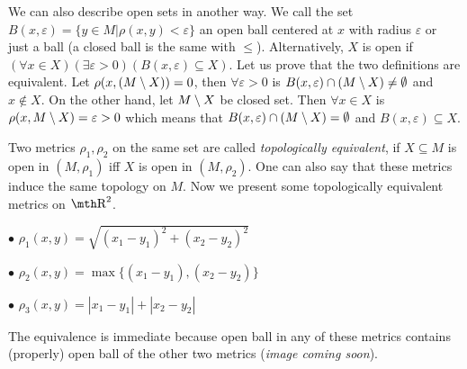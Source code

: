 \medskip

We can also describe open sets in another way. We call the set $B(x,
\varepsilon) = \{y\in M|\rho(x,y)<\varepsilon\}$ an open ball centered at $x$ 
with radius $\varepsilon$ or just a ball (a closed ball is the same with 
$\leq$). Alternatively, $X$ is open if $(\forall x\in X)(\exists \varepsilon 
> 0)(B(x,\varepsilon)\subseteq X)$. Let us prove that the two definitions 
are equivalent. Let $\rho(x,(M\setminus X)) = 0$, then $\forall \varepsilon > 0$ 
is $B(x,\varepsilon) \cap (M\setminus X) \neq \emptyset$ and $x\notin X$.
On the other hand, let $M\setminus X$ be closed set. Then $\forall x\in X$ is $\rho
(x,M\setminus X) = \varepsilon > 0$ which means that $B(x,\varepsilon) \cap (M\setminus X) 
= \emptyset$ and $B(x,\varepsilon) \subseteq X$.

\medskip

 Two metrics $\rho_1,\rho_2$ on the same set are 
called {\it topologically equivalent}, if $X\subseteq M$ is open in $(M,\rho_1)$ 
iff $X$ is open in $(M,\rho_2)$. One can also say that these metrics induce the 
same topology on $M$.
\medskip
Now we present some topologically equivalent metrics on $\R^2$.
{\parindent0.5in\parskip6pt
	\item{$\bullet$} $\rho_1(x,y) = \sqrt{ (x_1 - y_1)^2 + (x_2 - y_2)^2 }$
	\item{$\bullet$} $\rho_2(x,y) = \max\{(x_1 - y_1),(x_2-y_2)\}$
	\item{$\bullet$} $\rho_3(x,y) = |x_1 - y_1| + |x_2-y_2|$

}
The equivalence is immediate because open ball in any of these metrics contains
(properly) open ball of the other two metrics ({\it image coming soon}).

